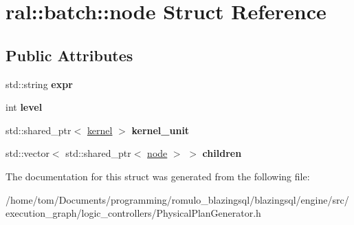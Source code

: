 \hypertarget{structral_1_1batch_1_1node}{}\section{ral\+:\+:batch\+:\+:node Struct Reference}
\label{structral_1_1batch_1_1node}
\subsection*{Public Attributes}
\begin{DoxyCompactItemize}
\item 
\mbox{\label{structral_1_1batch_1_1node_aadfd2dec482281f33d247266efc8369b}} 
std\+::string {\bfseries expr}
\item 
\mbox{\label{structral_1_1batch_1_1node_a5d0312066954fe8c2b927495d5672bc5}} 
int {\bfseries level}
\item 
\mbox{\label{structral_1_1batch_1_1node_a3b0ca24944155ffcc441847d261abc54}} 
std\+::shared\+\_\+ptr$<$ \hyperlink{classral_1_1cache_1_1kernel}{kernel} $>$ {\bfseries kernel\+\_\+unit}
\item 
\mbox{\label{structral_1_1batch_1_1node_af5550d1ef38af236015a1bc609e20fa1}} 
std\+::vector$<$ std\+::shared\+\_\+ptr$<$ \hyperlink{structral_1_1batch_1_1node}{node} $>$ $>$ {\bfseries children}
\end{DoxyCompactItemize}


The documentation for this struct was generated from the following file\+:\begin{DoxyCompactItemize}
\item 
/home/tom/\+Documents/programming/romulo\+\_\+blazingsql/blazingsql/engine/src/execution\+\_\+graph/logic\+\_\+controllers/Physical\+Plan\+Generator.\+h\end{DoxyCompactItemize}
